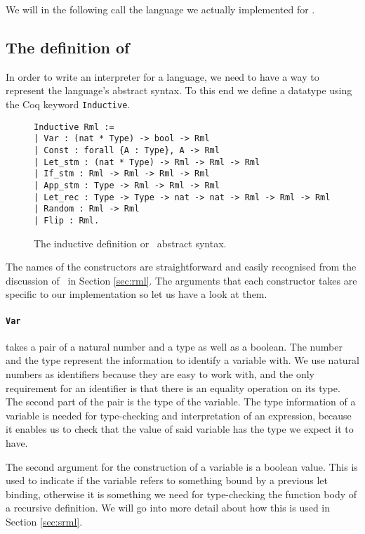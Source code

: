 \documentclass[11pt, leqno, titlepage]{article}
\def\coqe{\lstinline[language=Coq, basicstyle=\small]}
\theoremstyle{definition}
\begin{document}
We will in the following call the language we actually implemented for \rmlx.

\subsection{The definition of \rmlx}
\label{sec:rmlx}

In order to write an interpreter for a language, we need to have a way to represent
the language's abstract syntax. To this end we define a datatype using the Coq
keyword \coqe{Inductive}. 

\begin{figure}[h]
  \centering
  \begin{minipage}{0.8\linewidth}
    \begin{lstlisting}[language=coq]
Inductive Rml :=
| Var : (nat * Type) -> bool -> Rml 
| Const : forall {A : Type}, A -> Rml
| Let_stm : (nat * Type) -> Rml -> Rml -> Rml
| If_stm : Rml -> Rml -> Rml -> Rml
| App_stm : Type -> Rml -> Rml -> Rml
| Let_rec : Type -> Type -> nat -> nat -> Rml -> Rml -> Rml
| Random : Rml -> Rml
| Flip : Rml.
    \end{lstlisting}
  \end{minipage}
  \caption{The inductive definition or \rmlx\ abstract syntax.}
  \label{fig:rmlx}
\end{figure}


The names of the constructors are straightforward and easily recognised from the
discussion of \rml\ in Section \ref{sec:rml}. The arguments that each constructor
takes are specific to our implementation so let us have a look at them.

\paragraph{\coqe{Var}} takes a pair of a natural number and a type as well as a boolean. 
The number and the type represent the information to identify a variable with. We use
natural numbers as identifiers because they are easy to work with, and the only
requirement for an identifier is that there is an equality operation on its type. The
second part of the pair is the type of the variable. The type information of a
variable is needed for type-checking and interpretation of an expression, because it
enables us to check that the value of said variable has the type we expect it to
have.

The second argument for the construction of a variable is a boolean value. This is
used to indicate if the variable refers to something bound by a previous let binding,
otherwise it is something we need for type-checking the function body of a recursive
definition. We will go into more detail about how this is used in Section \ref{sec:srml}.
\end{document}
